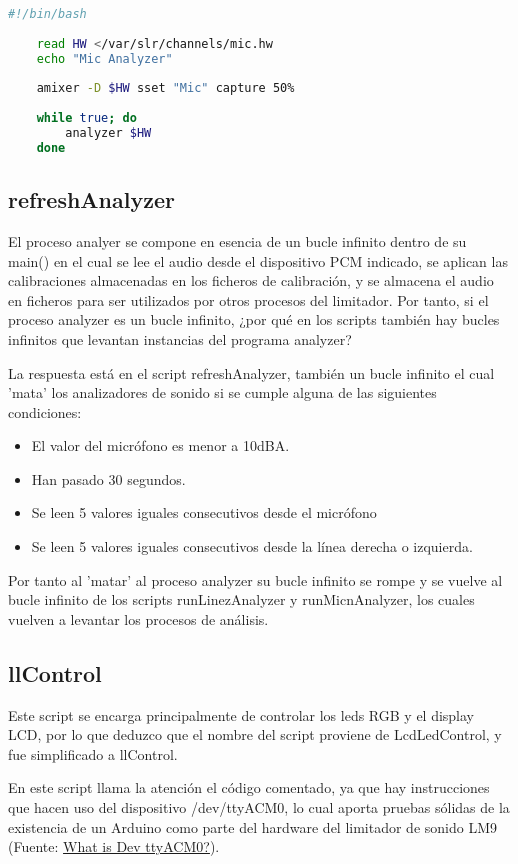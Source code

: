 \documentclass[]{article}
\begin{document}
\begin{lstlisting}[language=bash, caption=Script runMicAnalyzer]
	#!/bin/bash
	
	read HW </var/slr/channels/mic.hw
	echo "Mic Analyzer"
	
	amixer -D $HW sset "Mic" capture 50%
	
	while true; do
		analyzer $HW
	done
\end{lstlisting}

\subsection{refreshAnalyzer}
El proceso analyer se compone en esencia de un bucle infinito dentro de su main() en el cual se lee el audio desde el dispositivo PCM indicado, se aplican las calibraciones almacenadas en los ficheros de calibración, y se almacena el audio en ficheros para ser utilizados por otros procesos del limitador. Por tanto, si el proceso analyzer es un bucle infinito, ¿por qué en los scripts también hay bucles infinitos que levantan instancias del programa analyzer?

La respuesta está en el script refreshAnalyzer, también un bucle infinito el cual 'mata' los analizadores de sonido si se cumple alguna de las siguientes condiciones:

\begin{itemize}
	\item El valor del micrófono es menor a 10dBA.
	\item Han pasado 30 segundos.
	\item Se leen 5 valores iguales consecutivos desde el micrófono
	\item Se leen 5 valores iguales consecutivos desde la línea derecha o izquierda.
\end{itemize}

Por tanto al 'matar' al proceso analyzer su bucle infinito se rompe y se vuelve al bucle infinito de los scripts runLinezAnalyzer y runMicnAnalyzer, los cuales vuelven a levantar los procesos de análisis.

\subsection{llControl}
Este script se encarga principalmente de controlar los leds RGB y el display LCD, por lo que deduzco que el nombre del script proviene de LcdLedControl, y fue simplificado a llControl.

En este script llama la atención el código comentado, ya que hay instrucciones que hacen uso del dispositivo /dev/ttyACM0, lo cual aporta pruebas sólidas de la existencia de un Arduino como parte del hardware del limitador de sonido LM9 (Fuente: \href{https://arduino.stackexchange.com/questions/19648/difference-between-dev-ttyacm0-and-dev-ttys0-arduino-ide-ports-under-linux}{What is Dev ttyACM0?}).
\end{document}
